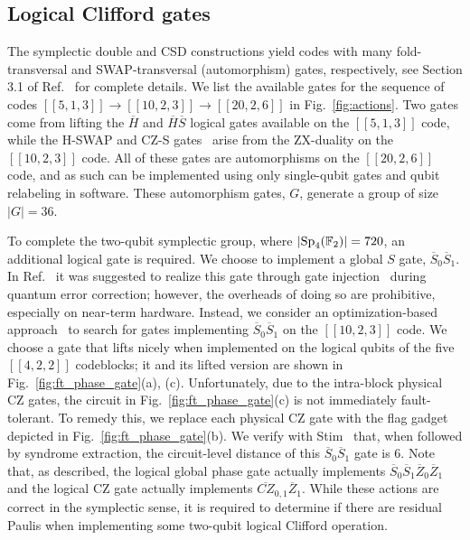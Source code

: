 \subsection{Logical Clifford gates}

The symplectic double and CSD constructions yield codes with many fold-transversal and SWAP-transversal (automorphism) gates, respectively, see Section 3.1 of Ref.~\cite{berthusen2025simple} for complete details. We list the available gates for the sequence of codes $[[5,1,3]] \rightarrow [[10,2,3]] \rightarrow [[20,2,6]]$ in Fig.~\ref{fig:actions}. Two gates come from lifting the $\overline{H}$ and $\overline{H} \overline{S}$ logical gates available on the $[[5,1,3]]$ code, while the H-SWAP and CZ-S gates~\cite{Breuckmann_2024} arise from the ZX-duality on the $[[10,2,3]]$ code. All of these gates are automorphisms on the $[[20,2,6]]$ code, and as such can be implemented using only single-qubit gates and qubit relabeling in software. These automorphism gates, $G$, generate a group of size $|G| = 36$. 

To complete the two-qubit symplectic group, where $|\rm{Sp}_4(\mathbb{F}_2)| = 720$, an additional logical gate is required. We choose to implement a global $S$ gate, $\overline{S}_0 \overline{S}_1$. In Ref.~\cite{berthusen2025simple} it was suggested to realize this gate through gate injection~\cite{Zhou2000} during quantum error correction; however, the overheads of doing so are prohibitive, especially on near-term hardware. Instead, we consider an optimization-based approach~\cite{kuehnke2025} to search for gates implementing $\overline{S}_0\overline{S}_1$ on the $[[10,2,3]]$ code. We choose a gate that lifts nicely when implemented on the logical qubits of the five $[[4,2,2]]$ codeblocks; it and its lifted version are shown in Fig.~\ref{fig:ft_phase_gate}(a), (c). Unfortunately, due to the intra-block physical CZ gates, the circuit in Fig.~\ref{fig:ft_phase_gate}(c) is not immediately fault-tolerant. To remedy this, we replace each physical CZ gate with the flag gadget~\cite{Chao_2018} depicted in Fig.~\ref{fig:ft_phase_gate}(b). We verify with Stim~\cite{Gidney_2021} that, when followed by syndrome extraction, the circuit-level distance of this $\overline{S}_0\overline{S}_1$ gate is 6. Note that, as described, the logical global phase gate actually implements $\overline{S}_0 \overline{S}_1 \overline{Z}_0 \overline{Z}_1$ and the logical CZ gate actually implements $\overline{CZ}_{0,1} \overline{Z}_1$. While these actions are correct in the symplectic sense, it is required to determine if there are residual Paulis when implementing some two-qubit logical Clifford operation.









